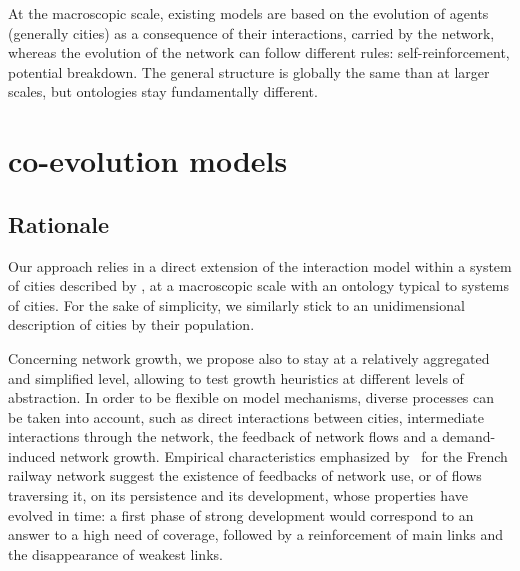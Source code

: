 
At the macroscopic scale, existing models are based on the evolution of agents (generally cities) as a consequence of their interactions, carried by the network, whereas the evolution of the network can follow different rules: self-reinforcement, potential breakdown. The general structure is globally the same than at larger scales, but ontologies stay fundamentally different.



\subsection{}







\section{ co-evolution models}



\subsection{Rationale}

Our approach relies in a direct extension of the interaction model within a system of cities described by \cite{raimbault2018indirect}, at a macroscopic scale with an ontology typical to systems of cities. For the sake of simplicity, we similarly stick to an unidimensional description of cities by their population.


Concerning network growth, we propose also to stay at a relatively aggregated and simplified level, allowing to test growth heuristics at different levels of abstraction. In order to be flexible on model mechanisms, diverse processes can be taken into account, such as direct interactions between cities, intermediate interactions through the network, the feedback of network flows and a demand-induced network growth. Empirical characteristics emphasized by~\cite{thevenin2013mapping} for the French railway network suggest the existence of feedbacks of network use, or of flows traversing it, on its persistence and its development, whose properties have evolved in time: a first phase of strong development would correspond to an answer to a high need of coverage, followed by a reinforcement of main links and the disappearance of weakest links.


